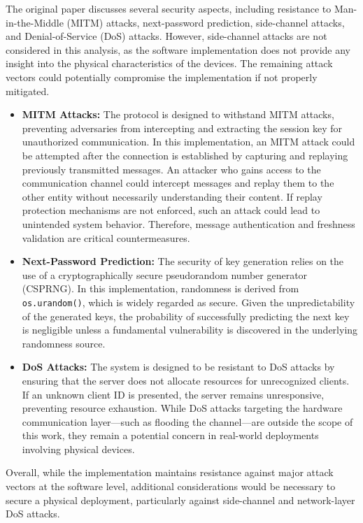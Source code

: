 \documentclass[10pt,twocolumn,letterpaper]{article}
\begin{document}
The original paper discusses several security aspects, including resistance to Man-in-the-Middle (MITM) attacks, next-password prediction, side-channel attacks, and Denial-of-Service (DoS) attacks. However, side-channel attacks are not considered in this analysis, as the software implementation does not provide any insight into the physical characteristics of the devices. The remaining attack vectors could potentially compromise the implementation if not properly mitigated.

\begin{itemize}
    \item \textbf{MITM Attacks:}  
    The protocol is designed to withstand MITM attacks, preventing adversaries from intercepting and extracting the session key for unauthorized communication. In this implementation, an MITM attack could be attempted after the connection is established by capturing and replaying previously transmitted messages. An attacker who gains access to the communication channel could intercept messages and replay them to the other entity without necessarily understanding their content. If replay protection mechanisms are not enforced, such an attack could lead to unintended system behavior. Therefore, message authentication and freshness validation are critical countermeasures.

    \item \textbf{Next-Password Prediction:}  
    The security of key generation relies on the use of a cryptographically secure pseudorandom number generator (CSPRNG). In this implementation, randomness is derived from \texttt{os.urandom()}, which is widely regarded as secure. Given the unpredictability of the generated keys, the probability of successfully predicting the next key is negligible unless a fundamental vulnerability is discovered in the underlying randomness source.

    \item \textbf{DoS Attacks:}  
    The system is designed to be resistant to DoS attacks by ensuring that the server does not allocate resources for unrecognized clients. If an unknown client ID is presented, the server remains unresponsive, preventing resource exhaustion. While DoS attacks targeting the hardware communication layer—such as flooding the channel—are outside the scope of this work, they remain a potential concern in real-world deployments involving physical devices.
\end{itemize}

Overall, while the implementation maintains resistance against major attack vectors at the software level, additional considerations would be necessary to secure a physical deployment, particularly against side-channel and network-layer DoS attacks.
\end{document}
